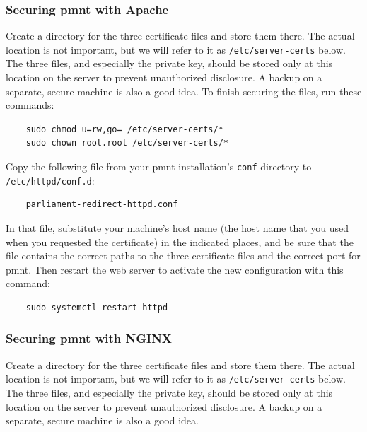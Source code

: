 \subsubsection{Securing \ac{pmnt} with Apache}
\label{section-securing-parliament-apache}

Create a directory for the three certificate files and store them there.  The actual location is not important, but we will refer to it as \texttt{/etc/server-certs} below.  The three files, and especially the private key, should be stored only at this location on the server to prevent unauthorized disclosure.  A backup on a separate, secure machine is also a good idea.  To finish securing the files, run these commands:

\begin{Verbatim}
	sudo chmod u=rw,go= /etc/server-certs/*
	sudo chown root.root /etc/server-certs/*
\end{Verbatim}

Copy the following file from your \ac{pmnt} installation's \texttt{conf} directory to \texttt{/etc/httpd/conf.d}:

\begin{Verbatim}
	parliament-redirect-httpd.conf
\end{Verbatim}

In that file, substitute your machine's host name (the host name that you used when you requested the certificate) in the indicated places, and be sure that the file contains the correct paths to the three certificate files and the correct port for \ac{pmnt}.  Then restart the web server to activate the new configuration with this command:

\begin{Verbatim}
	sudo systemctl restart httpd
\end{Verbatim}



\subsubsection{Securing \ac{pmnt} with NGINX}
\label{section-securing-parliament-nginx}

Create a directory for the three certificate files and store them there.  The actual location is not important, but we will refer to it as \texttt{/etc/server-certs} below.  The three files, and especially the private key, should be stored only at this location on the server to prevent unauthorized disclosure.  A backup on a separate, secure machine is also a good idea.

